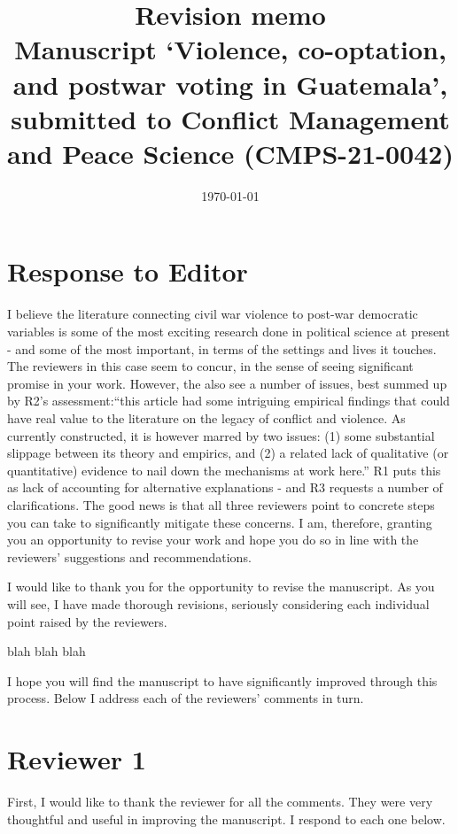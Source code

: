 \documentclass[12pt, a4paper, notitlepage]{article}
\title{\Large \textbf{Revision memo}\\{\large Manuscript `Violence, co-optation, and postwar voting in Guatemala', submitted to Conflict Management and Peace Science (CMPS-21-0042)}}
\author{}
\date{\today}
\begin{document}
\maketitle

\section*{Response to Editor}

\begin{displayquote}
I believe the literature connecting civil war violence to post-war democratic variables is some of the most exciting research done in political science at present - and some of the most important, in terms of the settings and lives it touches.  The reviewers in this case seem to concur, in the sense of seeing significant promise in your work.  However, the also see a number of issues, best summed up by R2's assessment:``this article had some intriguing empirical findings that could have real value to the literature on the legacy of conflict and violence. As currently constructed, it is however marred by two issues: (1) some substantial slippage between its theory and empirics, and (2) a related lack of qualitative (or quantitative) evidence to nail down the mechanisms at work here.'' R1 puts this as lack of accounting for alternative explanations - and R3 requests a number of clarifications.  The good news is that all three reviewers point to concrete steps you can take to significantly mitigate these concerns.  I am, therefore, granting you an opportunity to revise your work and hope you do so in line with the reviewers' suggestions and recommendations.
\end{displayquote}

I would like to thank you for the opportunity to revise the manuscript. As you will see, I have made thorough revisions, seriously considering each individual point raised by the reviewers.

blah blah blah

I hope you will find the manuscript to have significantly improved through this process.
Below I address each of the reviewers' comments in turn.

\newpage
\section*{Reviewer 1}

First, I would like to thank the reviewer for all the comments. They were very thoughtful and useful in improving the manuscript. I respond to each one below.
\end{document}
